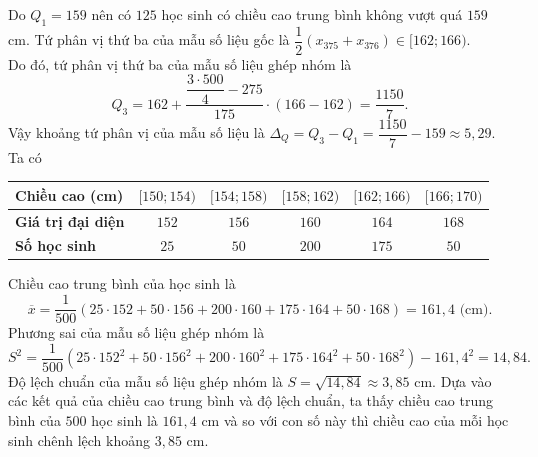 \begin{ex}[Mức độ 3]
{\begin{itemchoice}
		Do $Q_1= 159$ nên có $125$ học sinh có chiều cao trung bình không vượt quá $159$ cm.
		\itemch Tứ phân vị thứ ba của mẫu số liệu gốc là $\dfrac{1}{2}(x_{375} + x_{376}) \in [162; 166)$.\\
		Do đó, tứ phân vị thứ ba của mẫu số liệu ghép nhóm là
		$$ Q_3 = 162 + \dfrac{\dfrac{3\cdot 500}{4} - 275}{175} \cdot (166 - 162) = \dfrac{1150}{7}.$$
		Vậy khoảng tứ phân vị của mẫu số liệu là $\Delta _Q = Q_3 - Q_1 = \dfrac{1150}{7} - 159 \approx 5{,}29$.
		\itemch Ta có
		\begin{center}
			\begin{tabular}{|l|c|c|c|c|c|}
				\hline
				\textbf{Chiều cao (cm)} & $[150; 154)$ & $ [154; 158)$ & $ [158; 162)$ & $ [162; 166)$ & $ [166; 170)$   \\
				\hline
				\textbf{Giá trị đại diện} & $152$ & $ 156 $ & $160$ & $164$ & $168$ \\
				\hline
				\textbf{Số học sinh }&$25$ & $50$ & $200$ & $175$ & $50$ \\
				\hline
			\end{tabular}
		\end{center}
		\noindent
		Chiều cao trung bình của học sinh là 
		$$\overline{x} = \dfrac{1}{500}(25\cdot 152 + 50\cdot 156 + 200\cdot 160 + 175\cdot 164 + 50\cdot 168) = 161{,}4 \text{ (cm)}.$$
		Phương sai của mẫu số liệu ghép nhóm là
		$$S^2 = \dfrac{1}{500} \left(25\cdot 152^2 + 50\cdot 156^2 + 200\cdot 160^2 + 175\cdot 164^2 + 50\cdot 168^2 \right) - 161{,}4^2 = 14{,}84. $$
		Độ lệch chuẩn của mẫu số liệu ghép nhóm là $S = \sqrt{14{,}84} \approx 3{,}85$ cm.
		\itemch Dựa vào các kết quả của chiều cao trung bình và độ lệch chuẩn, ta thấy chiều cao trung bình của $500$ học sinh là $161{,}4$ cm và so với con số này thì chiều cao của mỗi học sinh chênh lệch khoảng $3{,}85$ cm.
	\end{itemchoice}	
	}
\end{ex}

